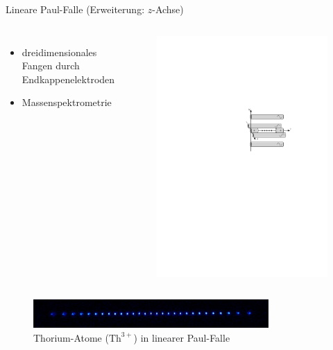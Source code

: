 \documentclass[12pt,xcolor=dvipsnames]{beamer}
\begin{document}
\begin{frame}{Lineare Paul-Falle (Erweiterung: $z$-Achse)}
	\begin{columns}[c]
		\begin{itemize}
				\setlength\itemsep{1em}
				\item dreidimensionales Fangen durch Endkappenelektroden
				
				\item Massenspektrometrie
		\end{itemize}
		
			\vspace{-0.2cm}
			\begin{figure}[h]
				\centering
				\includegraphics[width=1\textwidth]{./figures/lineare_paulfalle.pdf}
			\end{figure}
	\end{columns}
	
	\vspace{0.2cm}
		
	\begin{figure}[h]
		\centering
		\includegraphics[width=0.8\textwidth]{./figures/29_laser_cooled_ion_chain.jpg}
		\caption{Thorium-Atome ($\mathrm{Th}^{3+}$) in linearer Paul-Falle \cite{campbell}}
	\end{figure}
	
\end{frame}
\end{document}
